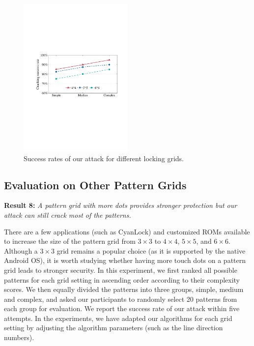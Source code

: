         \begin{figure}[!t]
            \centering
            \includegraphics[width=0.5\textwidth]{fig/scalability.pdf}
            \vspace{-3mm}
            \caption{Success rates of our attack for different locking grids.}
            \vspace{-2mm}
            \label{fig:scalability}
            \vspace{-2mm}
        \end{figure}

    \subsection{Evaluation on Other Pattern Grids\label{sec:scalability}}
    \noindent \textbf{Result 8:} \emph{A pattern grid with more dots provides stronger protection but our attack can still crack most of the patterns.}

        There are a few applications (such as CyanLock) and customized ROMs available to increase the size of the pattern grid from $3\times3$ to $4\times4$, $5\times5$, and $6\times6$.
        Although a $3 \times 3$ grid remains
        a popular choice (as it is supported by the native Android OS), it is worth studying whether
        having more touch dots on a pattern grid leads to stronger security. In this
        experiment, we first ranked all possible patterns for each grid setting in
        ascending order according to their complexity scores. We then equally
        divided the patterns into three groups, simple, medium and complex,
        and asked our participants to randomly select 20 patterns from each group for evaluation. We
        report the success rate of our attack within five attempts. In the experiments, we have adapted our algorithms for each grid setting
        by adjusting the algorithm parameters (such as the line direction numbers).


